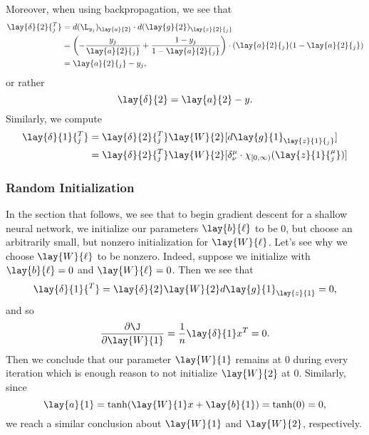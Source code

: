 Moreover, when using backpropagation, we see that
\begin{align*}
	\lay{\delta}{2}{^T_j}&=d(\L_{y_j})_{\lay{a}{2}}\cdot d(\lay{g}{2})_{\lay{z}{2}{_j}}\\
	&=\left(-\frac{y_j}{\lay{a}{2}{_j}}+\frac{1-y_j}{1-\lay{a}{2}{_j}}\right)\cdot(\lay{a}{2}{_j}(1-\lay{a}{2}{_j})\\
	&=\lay{a}{2}{_j}-y_j,
\end{align*}
or rather
$$\lay{\delta}{2}=\lay{a}{2}-y.$$
Similarly, we compute
\begin{align*}
	\lay{\delta}{1}{_j^T}&=\lay{\delta}{2}{_j^T}\lay{W}{2}[d\lay{g}{1}_{\lay{z}{1}{_j}}]\\
	&=\lay{\delta}{2}{_j^T}\lay{W}{2}[\delta^\mu_\nu\cdot\chi_{[0,\infty)}(\lay{z}{1}{^\mu_j})]
\end{align*}


\subsubsection{Random Initialization}
In the section that follows, we see that to begin gradient descent for a shallow neural network, we initialize our parameters $\lay{b}{\ell}$ to be $0$, but choose an arbitrarily small, but nonzero initialization for $\lay{W}{\ell}$.  Let's see why we choose $\lay{W}{\ell}$ to be nonzero.  Indeed, suppose we initialize with $\lay{b}{\ell}=0$ and $\lay{W}{\ell}=0$.  Then we see that
$$\lay{\delta}{1}{^T}=\lay{\delta}{2}\lay{W}{2}d\lay{g}{1}_{\lay{z}{1}}=0,$$
and so
$$\frac{\partial\J}{\partial\lay{W}{1}}=\frac{1}{n}\lay{\delta}{1}x^T=0.$$
Then we conclude that our parameter $\lay{W}{1}$ remains at $0$ during every iteration which is enough reason to not initialize $\lay{W}{2}$ at $0$.  Similarly, since
$$\lay{a}{1}=\tanh(\lay{W}{1}x+\lay{b}{1})=\tanh(0)=0,$$
we reach a similar conclusion about $\lay{W}{1}$ and $\lay{W}{2}$, respectively.
